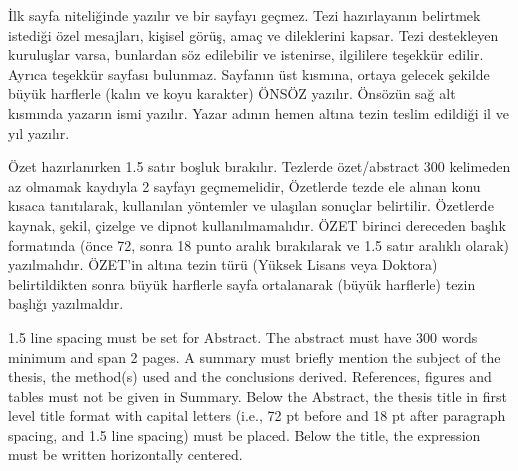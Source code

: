\documentclass[a4paper, 12pt, oneside]{GuThesis}
\begin{document}
\clearpage
\BgThispage
\thispagestyle{empty}
\secpage
\thispagestyle{empty}
\approform
{}
\setcounter{page}{3}

\begin{preface} \par 
İlk sayfa niteliğinde yazılır ve bir sayfayı geçmez. Tezi hazırlayanın belirtmek istediği özel mesajları, kişisel görüş, amaç ve dileklerini kapsar. Tezi destekleyen kuruluşlar varsa, bunlardan söz edilebilir ve istenirse, ilgililere teşekkür edilir. Ayrıca teşekkür sayfası bulunmaz. Sayfanın üst kısmına, ortaya gelecek şekilde büyük harflerle (kalın ve koyu karakter) ÖNSÖZ yazılır. Önsözün sağ alt kısmında yazarın ismi yazılır. Yazar adının hemen altına tezin teslim edildiği il ve yıl yazılır.
\end{preface}
\thesdec
\tableofcontents
\newpage
\begin{turabstract}

Özet hazırlanırken 1.5 satır boşluk bırakılır. Tezlerde özet/abstract 300 kelimeden az olmamak kaydıyla 2 sayfayı geçmemelidir,  Özetlerde tezde ele alınan konu kısaca tanıtılarak, kullanılan yöntemler ve ulaşılan sonuçlar belirtilir.  Özetlerde kaynak, şekil, çizelge ve dipnot kullanılmamalıdır.  ÖZET  birinci dereceden başlık formatında (önce 72, sonra 18 punto aralık bırakılarak ve 1.5 satır aralıklı olarak) yazılmalıdır. ÖZET'in altına tezin türü (Yüksek Lisans veya Doktora)  belirtildikten sonra büyük harflerle sayfa ortalanarak (büyük harflerle) tezin başlığı yazılmaldır.

\end{turabstract}
\begin{engabstract}

1.5 line spacing must be set for Abstract. The abstract must have 300 words minimum and span 2 pages. A summary must briefly mention the subject of the thesis, the method(s) used and the conclusions derived. References, figures and tables must not be given in Summary. Below the Abstract, the thesis title in first level title format with capital letters (i.e., 72 pt before and 18 pt after paragraph spacing, and 1.5 line spacing) must be placed. Below the title, the expression must be written horizontally centered.

\end{engabstract}
\end{document}

